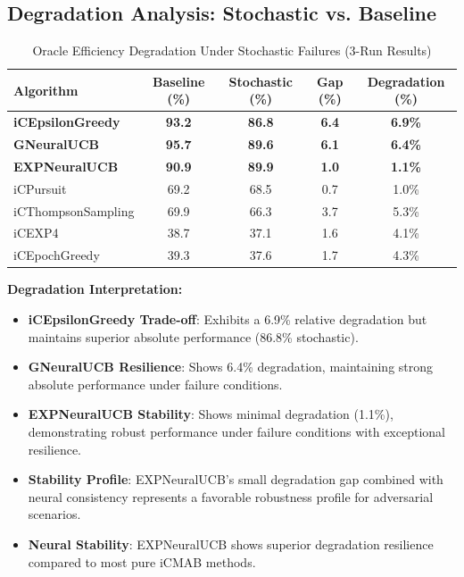 \documentclass[12pt,a4paper]{article}
\newcommand{\primarytext}[1]{\textcolor{primaryblue}{\textbf{#1}}}
\newcommand{\secondarytext}[1]{\textcolor{secondaryblue}{\textbf{#1}}}
\newcommand{\success}[1]{\textcolor{accentgreen}{\textbf{#1}}}
\newcommand{\legacy}[1]{\textcolor{legacycolor}{\textbf{#1}}}
\newcommand{\neural}[1]{\textcolor{neuralcolor}{\textbf{#1}}}
\begin{document}
\subsection{Degradation Analysis: Stochastic vs. Baseline}

\begin{table}[H]
\centering
\caption{Oracle Efficiency Degradation Under Stochastic Failures (3-Run Results)}
\label{tab:degradation-analysis}
\begin{tabular}{@{}lcccc@{}}
\toprule
\textbf{Algorithm} & \textbf{Baseline (\%)} & \textbf{Stochastic (\%)} & \textbf{Gap (\%)} & \textbf{Degradation (\%)} \\
\midrule
\primarytext{iCEpsilonGreedy}   & \primarytext{93.2} & \primarytext{86.8} & \primarytext{6.4} & \primarytext{6.9\%} \\
\neural{GNeuralUCB}            & \neural{95.7} & \neural{89.6} & \neural{6.1} & \neural{6.4\%} \\
\legacy{EXPNeuralUCB}           & \legacy{90.9} & \legacy{89.9} & \legacy{1.0} & \legacy{1.1\%} \\
iCPursuit                       & 69.2 & 68.5 & 0.7 & 1.0\% \\
iCThompsonSampling              & 69.9 & 66.3 & 3.7 & 5.3\% \\
iCEXP4                          & 38.7 & 37.1 & 1.6 & 4.1\% \\
iCEpochGreedy                   & 39.3 & 37.6 & 1.7 & 4.3\% \\
\bottomrule
\end{tabular}
\end{table}

\textbf{Degradation Interpretation:}
\begin{itemize}
\item \primarytext{iCEpsilonGreedy Trade-off}: Exhibits a 6.9\% relative degradation but maintains superior absolute performance (86.8\% stochastic).
\item \neural{GNeuralUCB Resilience}: Shows 6.4\% degradation, maintaining strong absolute performance under failure conditions.
\item \legacy{EXPNeuralUCB Stability}: Shows minimal degradation (1.1\%), demonstrating robust performance under failure conditions with exceptional resilience.
\item \secondarytext{Stability Profile}: EXPNeuralUCB's small degradation gap combined with neural consistency represents a favorable robustness profile for adversarial scenarios.
\item \success{Neural Stability}: EXPNeuralUCB shows superior degradation resilience compared to most pure iCMAB methods.
\end{itemize}
\end{document}
